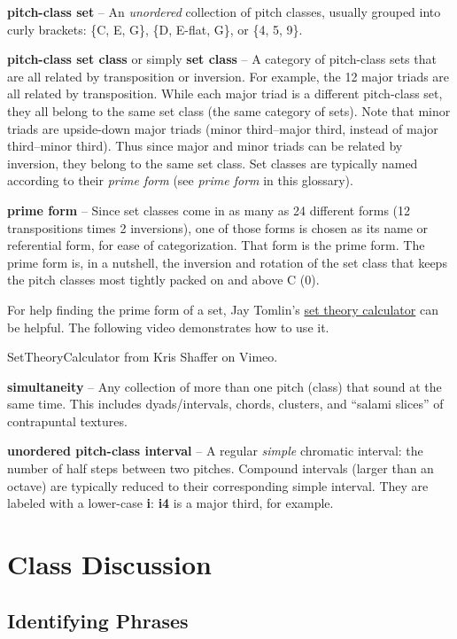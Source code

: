 \documentclass{book}
\begin{document}
\textbf{pitch-class set} -- An \emph{unordered} collection of pitch classes,
usually grouped into curly brackets: \{C, E, G\}, \{D, E-flat, G\}, or \{4, 5,
9\}.

\textbf{pitch-class set class} or simply \textbf{set class} -- A category of
pitch-class sets that are all related by transposition or inversion. For
example, the 12 major triads are all related by transposition. While each
major triad is a different pitch-class set, they all belong to the same set
class (the same category of sets). Note that minor triads are upside-down
major triads (minor third--major third, instead of major third--minor third).
Thus since major and minor triads can be related by inversion, they belong to
the same set class. Set classes are typically named according to their
\emph{prime form} (see \emph{prime form} in this glossary).

\textbf{prime form} -- Since set classes come in as many as 24 different forms
(12 transpositions times 2 inversions), one of those forms is chosen as its
name or referential form, for ease of categorization. That form is the prime
form. The prime form is, in a nutshell, the inversion and rotation of the set
class that keeps the pitch classes most tightly packed on and above C (0).

For help finding the prime form of a set, Jay Tomlin's
\href{http://www.jaytomlin.com/music/settheory/}{set theory calculator} can be
helpful. The following video demonstrates how to use it.

SetTheoryCalculator from Kris Shaffer on Vimeo.

\textbf{simultaneity} -- Any collection of more than one pitch (class) that
sound at the same time. This includes dyads/intervals, chords, clusters, and
``salami slices'' of contrapuntal textures.

\textbf{unordered pitch-class interval} -- A regular \emph{simple} chromatic
interval: the number of half steps between two pitches. Compound intervals
(larger than an octave) are typically reduced to their corresponding simple
interval. They are labeled with a lower-case \textbf{i}: \textbf{i4} is a
major third, for example.

\hypertarget{class-discussion-42}{%
\chapter{Class Discussion}\label{class-discussion-42}}

\hypertarget{identifying-phrases-1}{%
\section{Identifying Phrases}\label{identifying-phrases-1}}
\end{document}
